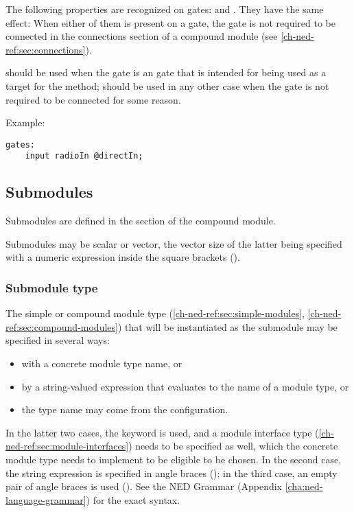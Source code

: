 The following properties are recognized on gates: 
and . They have the same effect: When either of them is
present on a gate, the gate is not required to be connected in the
connections section of a compound module (see \ref{ch-ned-ref:sec:connections}).

 should be used when the gate is an  gate that is
intended for being used as a target for the  method;
 should be used in any other case when the gate is not
required to be connected for some reason.

Example:

\begin{verbatim}
gates:
    input radioIn @directIn;
\end{verbatim}



\subsection{Submodules}
\label{ch-ned-ref:sec:submodules}

Submodules are defined in the  section of the compound module.

Submodules may be scalar or vector, the vector size of the latter being
specified with a numeric expression inside the square brackets (\ttt{[...]}).

\subsubsection{Submodule type}

The simple or compound module type (\ref{ch-ned-ref:sec:simple-modules},
\ref{ch-ned-ref:sec:compound-modules}) that will be instantiated as the
submodule may be specified in several ways:

\begin{itemize}
  \item with a concrete module type name, or
  \item by a string-valued expression that evaluates to the name of a
        module type, or
  \item the type name may come from the configuration.
\end{itemize}

In the latter two cases, the  keyword is used, and a
module interface type (\ref{ch-ned-ref:sec:module-interfaces})
needs to be specified as well, which the concrete module type needs
to implement to be eligible to be chosen. In the second case, the
string expression is specified in angle braces (); in the
third case, an empty pair of angle braces is used (\ttt{<>}).
See the NED Grammar (Appendix \ref{cha:ned-language-grammar}) for the
exact syntax.

